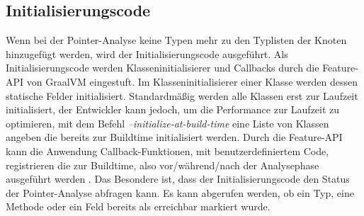 \subsection{Initialisierungscode}
\label{subsec:initializationcode}
Wenn bei der Pointer-Analyse keine Typen mehr zu den Typlisten der Knoten hinzugefügt werden, wird der Initialisierungscode ausgeführt. Als Initialisierungscode werden Klasseninitialisierer und Callbacks durch die Feature-API von GraalVM eingestuft.
Im Klasseninitialisierer einer Klasse werden dessen statische Felder initialisiert. Standardmäßig werden alle Klassen erst zur Laufzeit initialisiert, der Entwickler kann jedoch, um die Performance zur Laufzeit zu optimieren, mit dem Befehl \textit{--initialize-at-build-time} eine Liste von Klassen angeben die bereits zur Buildtime initialisiert werden\cite[Ab Version 19.0]{Wimmer2019Medium}.
Durch die Feature-API kann die Anwendung Callback-Funktionen, mit benutzerdefiniertem Code, registrieren die zur Buildtime, also vor/während/nach der Analysephase ausgeführt werden \cite{GraalVM}. Das Besondere ist, dass der Initialisierungscode den Status der Pointer-Analyse abfragen kann. Es kann abgerufen werden, ob ein Typ, eine Methode oder ein Feld bereits als \glqq erreichbar\grqq{} markiert wurde.

